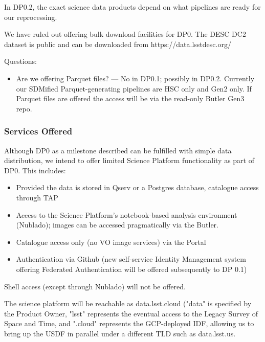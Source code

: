 In DP0.2, the exact science data products depend on what pipelines are ready for our reprocessing.

We have ruled out offering bulk download facilities for DP0.
The DESC DC2 dataset is public and can be downloaded from https://data.lsstdesc.org/

Questions:

\begin{itemize}

\item Are we offering Parquet files? --- No in DP0.1; possibly in DP0.2. Currently our SDMified Parquet-generating pipelines are HSC only and Gen2 only. If Parquet files are offered the access will be via the read-only Butler Gen3 repo.


\end{itemize}

\subsubsection{Services Offered}

Although DP0 as a milestone described  can be fulfilled with simple data distribution, we intend to offer limited Science Platform functionality as part of DP0. This includes:

\begin{itemize}

\item Provided the data is stored in Qserv or a Postgres database, catalogue access through TAP

\item Access to the Science Platform's notebook-based analysis environment (Nublado); images can be accessed pragmatically via the Butler.

\item Catalogue access only (no VO image services) via the Portal

\item Authentication via Github (new self-service Identity Management system offering Federated Authentication will be offered subsequently to DP 0.1)

\end{itemize}

Shell access (except through Nublado) will not be offered.

The science platform will be reachable as data.lsst.cloud ("data" is specified by the Product Owner, "lsst" represents the eventual access to the Legacy Survey of Space and Time, and ".cloud" represents the GCP-deployed IDF, allowing us to bring up the USDF in parallel under a different TLD such as data.lsst.us.

